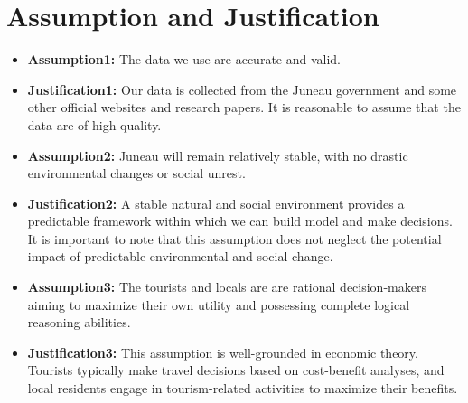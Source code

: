 \documentclass{mcmthesis}
\begin{document}
\section{Assumption and Justification}
\begin{itemize}
  \item \textbf{Assumption1:} The data we use are accurate and valid. 
  \item \textbf{Justification1:} Our data is collected from the Juneau government and some other official websites and research papers. 
  It is reasonable to assume that the data are of high quality.

  \item \textbf{Assumption2:} Juneau will remain relatively stable, with no drastic environmental changes or social unrest.
  \item \textbf{Justification2:} A stable natural and social environment provides a predictable framework within which we can build model and make decisions. 
  It is important to note that this assumption does not neglect the potential impact of predictable environmental and social change.
  
  \item \textbf{Assumption3:} The tourists and locals are are rational decision-makers aiming to maximize their own utility and possessing complete logical reasoning abilities.%
  \item \textbf{Justification3:} This assumption is well-grounded in economic theory. Tourists typically make travel decisions based on cost-benefit analyses\cite{crouch2004determinants}, 
  and local residents engage in tourism-related activities to maximize their benefits\cite{ap1992residents}.
\end{itemize}
\end{document}
